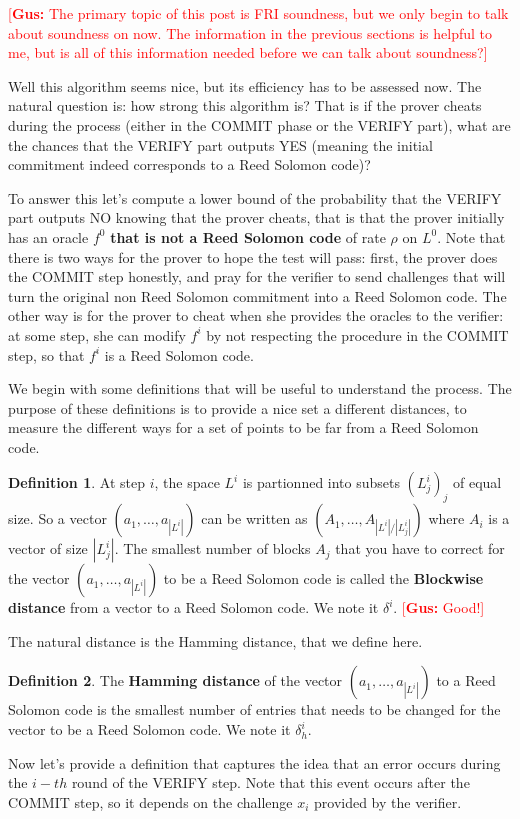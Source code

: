 \documentclass[12pt]{extarticle}
\newcommand{\<}{\langle}
\renewcommand{\>}{\rangle}
\theoremstyle{definition}
\newcommand{\gus}[1]{\textcolor{red}{[\textbf{Gus:} #1]}}
\newtheorem{defn}{Definition}
\begin{document}
\gus{The primary topic of this post is FRI soundness, but we only begin to talk about soundness on now.  The information in the previous sections is helpful to me, but is all of this information needed before we can talk about soundness?}

Well this algorithm seems nice, but its efficiency has to be assessed now. The natural question is: how strong this algorithm is? That is if the prover cheats during the process (either in the COMMIT phase or the VERIFY part), what are the chances that the VERIFY part outputs YES (meaning the initial commitment indeed corresponds to a Reed Solomon code)?

To answer this let's compute a lower bound of the probability that the VERIFY part outputs NO knowing that the prover cheats, that is that the prover initially has an oracle $f^0$ \textbf{that is not a Reed Solomon code} of rate $\rho$ on $L^0$. Note that there is two ways for the prover to hope the test will pass: first, the prover does the COMMIT step honestly, and pray for the verifier to send challenges that will turn the original non Reed Solomon commitment into a Reed Solomon code. The other way is for the prover to cheat when she provides the oracles to the verifier: at some step, she can modify $f^i$ by not respecting the procedure in the COMMIT step, so that $f^i$ is a Reed Solomon code.

We begin with some definitions that will be useful to understand the process. The purpose of these definitions is to provide a nice set a different distances, to measure the different ways for a set of points to be far from a Reed Solomon code.
\begin{defn}
At step $i$, the space $L^i$ is partionned into subsets $(L^i_j)_j$ of equal size. So a vector $(a_1,\dots,a_{|L^i|})$ can be written as $(A_1,\dots,A_{|L^i|/|L^i_j|})$ where $A_i$ is a vector of size $|L^i_j|$. The smallest number of blocks $A_j$ that you have to correct for the vector $(a_1,\dots,a_{|L^i|})$ to be a Reed Solomon code is called the \textbf{Blockwise distance} from a vector to a Reed Solomon code. We note it $\delta^i$. \gus{Good!}
\end{defn}
The natural distance is the Hamming distance, that we define here.
\begin{defn}
The \textbf{Hamming distance} of the vector $(a_1,\dots,a_{|L^i|})$ to a Reed Solomon code is the smallest number of entries that needs to be changed for the vector to be a Reed Solomon code. We note it $\delta_h^i$.
\end{defn}
Now let's provide a definition that captures the idea that an error occurs during the $i-th$ round of the VERIFY step. Note that this event occurs after the COMMIT step, so it depends on the challenge $x_i$ provided by the verifier.
\end{document}
